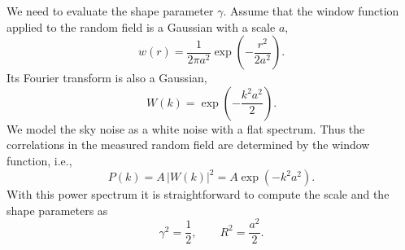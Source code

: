 \documentclass[twocolumn]{emulateapj}
\begin{document}
We need to evaluate the shape parameter $\gamma$. Assume that the window 
function applied to the random field is a Gaussian with a scale $a$,
\begin{equation}
	w(r) = \frac{1}{2\pi a^2} \exp\left(-\frac{r^2}{2 a^2}\right).
\end{equation}
Its Fourier transform is also a Gaussian,
\begin{equation}
	W(k) = \exp\left(-\frac{k^2a^2}{2}\right).
\end{equation}
We model the sky noise as a white noise with a flat spectrum. Thus the
correlations in the measured random field are determined by the window function,
i.e.,
\begin{equation}
	P(k) = A\,|W(k)|^2 = A \exp\left(-k^2a^2\right).
\end{equation}
With this power spectrum it is straightforward to compute the scale and the shape 
parameters as
\begin{equation}
	\gamma^2 = \frac{1}{2}, \qquad R^2 = \frac{a^2}{2}.
\end{equation}
\end{document}

